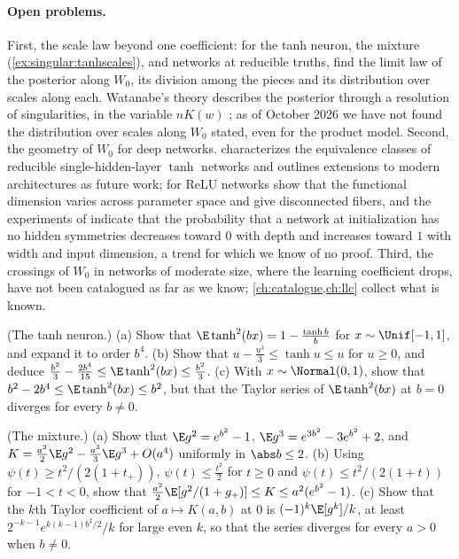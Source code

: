\begin{refsection}
\paragraph{Open problems.} First, the scale law beyond one coefficient: for the tanh neuron, the mixture (\cref{ex:singular:tanhscales}), and networks at reducible truths, find the limit law of the posterior along $W_0$, its division among the pieces and its distribution over scales along each. Watanabe's theory describes the posterior through a resolution of singularities, in the variable $nK(w)$ \parencite{Watanabe2009,Watanabe2024}; as of October 2026 we have not found the distribution over scales along $W_0$ stated, even for the product model. Second, the geometry of $W_0$ for deep networks. \Textcite{FarrugiaRoberts2023a} characterizes the equivalence classes of reducible single-hidden-layer $\tanh$ networks and outlines extensions to modern architectures as future work; for ReLU networks \textcite{GrigsbyEtAl2025} show that the functional dimension varies across parameter space and give disconnected fibers, and the experiments of \textcite{GrigsbyEtAl2023} indicate that the probability that a network at initialization has no hidden symmetries decreases toward $0$ with depth and increases toward $1$ with width and input dimension, a trend for which we know of no proof. Third, the crossings of $W_0$ in networks of moderate size, where the learning coefficient drops, have not been catalogued as far as we know; \cref{ch:catalogue,ch:llc} collect what is known.

\begin{exercises}
\item \consolidation\hard (The tanh neuron.) (a) Show that $\E\tanh^2(bx)=1-\frac{\tanh b}b$ for $x\sim\Unif[-1,1]$, and expand it to order $b^4$. (b) Show that $u-\frac{u^3}3\le\tanh u\le u$ for $u\ge0$, and deduce $\frac{b^2}3-\frac{2b^4}{15}\le\E\tanh^2(bx)\le\frac{b^2}3$. (c) With $x\sim\Normal(0,1)$, show that $b^2-2b^4\le\E\tanh^2(bx)\le b^2$, but that the Taylor series of $\E\tanh^2(bx)$ at $b=0$ diverges for every $b\ne0$. \label{ex:singular:tanh}

\item \consolidation\hard (The mixture.) (a) Show that $\E g^2=e^{b^2}-1$, $\E g^3=e^{3b^2}-3e^{b^2}+2$, and $K=\frac{a^2}2\E g^2-\frac{a^3}3\E g^3+O(a^4)$ uniformly in $\abs b\le2$. (b) Using $\psi(t)\ge t^2/(2(1+t_+))$, $\psi(t)\le\frac{t^2}2$ for $t\ge0$ and $\psi(t)\le t^2/(2(1+t))$ for $-1<t<0$, show that $\frac{a^2}2\E[g^2/(1+g_+)]\le K\le a^2(e^{b^2}-1)$. (c) Show that the $k$th Taylor coefficient of $a\mapsto K(a,b)$ at $0$ is $(-1)^k\E[g^k]/k$, at least $2^{-k-1}e^{k(k-1)b^2/2}/k$ for large even $k$, so that the series diverges for every $a>0$ when $b\ne0$. \label{ex:singular:mixture}


\end{exercises}
\end{refsection}
